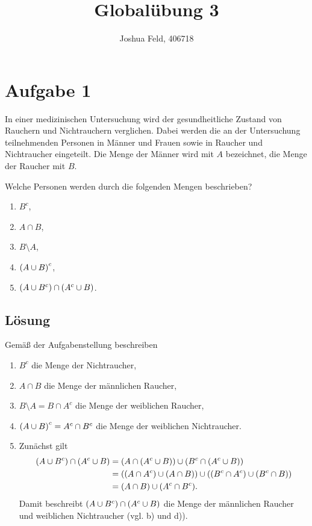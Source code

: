 \documentclass{exercise}
\institute{Institut für Statistik und Wirtschaftsmathematik}
\title{Globalübung 3}
\author{Joshua Feld, 406718}
\begin{document}
    \maketitle


    \section*{Aufgabe 1}

    \begin{problem}
        In einer medizinischen Untersuchung wird der gesundheitliche Zustand von Rauchern und Nichtrauchern verglichen.
        Dabei werden die an der Untersuchung teilnehmenden Personen in Männer und Frauen sowie in Raucher und Nichtraucher eingeteilt.
        Die Menge der Männer wird mit \(A\) bezeichnet, die Menge der Raucher mit \(B\).
        
        Welche Personen werden durch die folgenden Mengen beschrieben?
        \begin{enumerate}
            \item \(B^c\),
            \item \(A \cap B\),
            \item \(B \setminus A\),
            \item \(\parentheses*{A \cup B}^c\),
            \item \(\parentheses*{A \cup B^c} \cap \parentheses*{A^c \cup B}\).
        \end{enumerate}
    \end{problem}

    \subsection*{Lösung}
    Gemäß der Aufgabenstellung beschreiben
    \begin{enumerate}
        \item \(B^c\) die Menge der Nichtraucher,
        \item \(A \cap B\) die Menge der männlichen Raucher,
        \item \(B \setminus A = B \cap A^c\) die Menge der weiblichen Raucher,
        \item \(\parentheses*{A \cup B}^c = A^c \cap B^c\) die Menge der weiblichen Nichtraucher.
        \item Zunächst gilt
        \begin{align*}
            \parentheses*{A \cup B^c} \cap \parentheses*{A^c \cup B} &= \parentheses*{A \cap \parentheses*{A^c \cup B}} \cup \parentheses*{B^c \cap \parentheses*{A^c \cup B}}\\
            &= \parentheses*{\parentheses*{A \cap A^c} \cup \parentheses*{A \cap B}} \cup \parentheses*{\parentheses*{B^c \cap A^c} \cup \parentheses*{B^c \cap B}}\\
            &= \parentheses*{A \cap B} \cup \parentheses*{A^c \cap B^c}.
        \end{align*}
        Damit beschreibt \(\parentheses*{A \cup B^c} \cap \parentheses*{A^c \cup B}\) die Menge der männlichen Raucher und weiblichen Nichtraucher (vgl. b) und d)).
    \end{enumerate}
\end{document}
